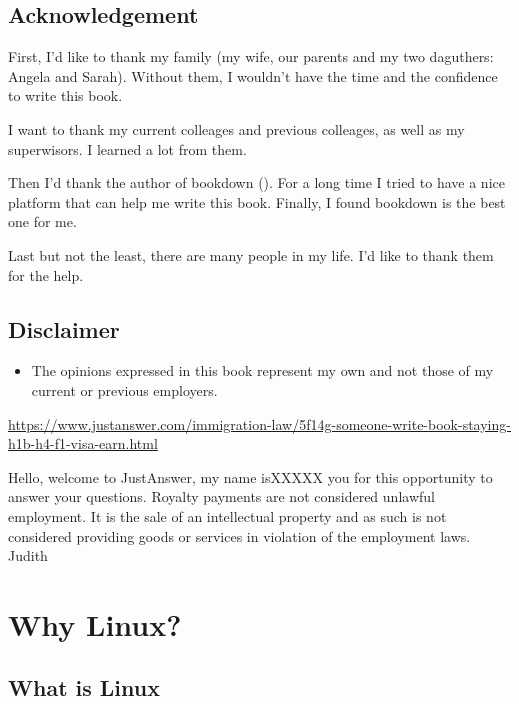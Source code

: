 \documentclass[]{book}
\providecommand{\tightlist}{%
  \setlength{\itemsep}{0pt}\setlength{\parskip}{0pt}}
\theoremstyle{definition}
\theoremstyle{definition}
\theoremstyle{definition}
\theoremstyle{remark}
\begin{document}
\section*{Acknowledgement}\label{acknowledgement}

First, I'd like to thank my family (my wife, our parents and my two
daguthers: Angela and Sarah). Without them, I wouldn't have the time and
the confidence to write this book.

I want to thank my current colleages and previous colleages, as well as
my superwisors. I learned a lot from them.

Then I'd thank the author of bookdown (\citet{R-bookdown}). For a long
time I tried to have a nice platform that can help me write this book.
Finally, I found bookdown is the best one for me.

Last but not the least, there are many people in my life. I'd like to
thank them for the help.

\section*{Disclaimer}\label{disclaimer}

\begin{itemize}
\tightlist
\item
  The opinions expressed in this book represent my own and not those of
  my current or previous employers.
\end{itemize}

\url{https://www.justanswer.com/immigration-law/5f14g-someone-write-book-staying-h1b-h4-f1-visa-earn.html}

Hello, welcome to JustAnswer, my name isXXXXX you for this opportunity
to answer your questions. Royalty payments are not considered unlawful
employment. It is the sale of an intellectual property and as such is
not considered providing goods or services in violation of the
employment laws. Judith

\chapter{Why Linux?}\label{why-linux}

\section{What is Linux}\label{what-is-linux}
\end{document}
